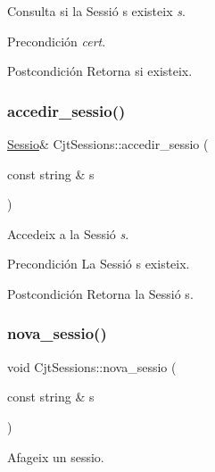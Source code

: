 Consulta si la Sessió s existeix {\itshape s}. 

\begin{DoxyPrecond}{Precondición}
{\itshape cert}. 
\end{DoxyPrecond}
\begin{DoxyPostcond}{Postcondición}
Retorna si existeix. 
\end{DoxyPostcond}
\mbox{\label{class_cjt_sessions_a373d89dde7bb62322feb50f3a299d5de}} 
\subsubsection{\texorpdfstring{accedir\+\_\+sessio()}{accedir\_sessio()}}
{\footnotesize\ttfamily \mbox{\hyperlink{class_sessio}{Sessio}}\& Cjt\+Sessions\+::accedir\+\_\+sessio (\begin{DoxyParamCaption}\item[{const string \&}]{s }\end{DoxyParamCaption})}



Accedeix a la Sessió {\itshape s}. 

\begin{DoxyPrecond}{Precondición}
La Sessió s existeix. 
\end{DoxyPrecond}
\begin{DoxyPostcond}{Postcondición}
Retorna la Sessió s. 
\end{DoxyPostcond}
\mbox{\label{class_cjt_sessions_ac6e00a3727d5ece89965a4f38d707273}} 
\subsubsection{\texorpdfstring{nova\+\_\+sessio()}{nova\_sessio()}}
{\footnotesize\ttfamily void Cjt\+Sessions\+::nova\+\_\+sessio (\begin{DoxyParamCaption}\item[{const string \&}]{s }\end{DoxyParamCaption})}



Afageix un sessio. 


